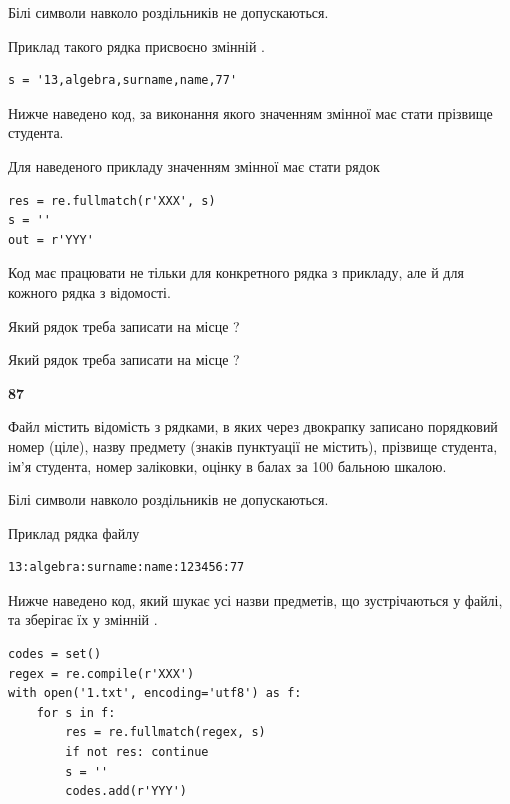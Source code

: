 Білі символи навколо роздільників не допускаються.

Приклад такого рядка присвоєно змінній .



\begin{verbatim}
s = '13,algebra,surname,name,77'
\end{verbatim}


Нижче наведено код, за виконання якого значенням змінної  має стати прізвище студента.

Для наведеного прикладу значенням змінної  має стати рядок 



\begin{verbatim}
res = re.fullmatch(r'XXX', s)
s = ''
out = r'YYY'
\end{verbatim}


Код має працювати не тільки для конкретного рядка з прикладу, але й для кожного рядка з відомості.




Який рядок треба записати на місце  ?\par
\vspace{5mm}


Який рядок треба записати на місце  ?\par


\newpage

{\begin {center}\textbf{ 87}\end {center}}\par
Файл  містить відомість з рядками, в яких через двокрапку записано поряд\-ковий номер (ціле), назву предмету (знаків пунктуації не містить), прізвище студента, ім'я студента, номер заліковки, оцінку в балах за 100 бальною шкалою.

Білі символи навколо роздільників не допускаються.

Приклад рядка файлу



\begin{verbatim}
13:algebra:surname:name:123456:77
\end{verbatim}


Нижче наведено код, який шукає усі назви предметів, що зустрічаються у файлі, та зберігає їх у змінній .



\begin{verbatim}
codes = set()
regex = re.compile(r'XXX')
with open('1.txt', encoding='utf8') as f:
    for s in f:
        res = re.fullmatch(regex, s)
        if not res: continue
        s = ''
        codes.add(r'YYY')
\end{verbatim}





